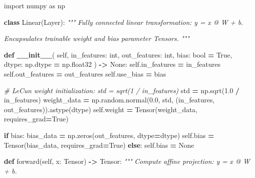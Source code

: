 \documentclass[
  letterpaper,
]{scrbook}
\newenvironment{Shaded}{\begin{snugshade}}{\end{snugshade}}
\newcommand{\BuiltInTok}[1]{#1}
\newcommand{\CommentTok}[1]{\textcolor[rgb]{0.56,0.35,0.01}{\textit{#1}}}
\newcommand{\ControlFlowTok}[1]{\textcolor[rgb]{0.13,0.29,0.53}{\textbf{#1}}}
\newcommand{\FloatTok}[1]{\textcolor[rgb]{0.00,0.00,0.81}{#1}}
\newcommand{\FunctionTok}[1]{\textcolor[rgb]{0.13,0.29,0.53}{\textbf{#1}}}
\newcommand{\ImportTok}[1]{#1}
\newcommand{\KeywordTok}[1]{\textcolor[rgb]{0.13,0.29,0.53}{\textbf{#1}}}
\newcommand{\NormalTok}[1]{#1}
\newcommand{\OperatorTok}[1]{\textcolor[rgb]{0.81,0.36,0.00}{\textbf{#1}}}
\newcommand{\VariableTok}[1]{\textcolor[rgb]{0.00,0.00,0.00}{#1}}
\begin{document}
\begin{Shaded}
\begin{Highlighting}[]
\ImportTok{import}\NormalTok{ numpy }\ImportTok{as}\NormalTok{ np}

\KeywordTok{class}\NormalTok{ Linear(Layer):}
    \CommentTok{"""}
\CommentTok{    Fully connected linear transformation: y = x @ W + b.}

\CommentTok{    Encapsulates trainable weight and bias parameter Tensors.}
\CommentTok{    """}

    \KeywordTok{def} \FunctionTok{\_\_init\_\_}\NormalTok{(}
        \VariableTok{self}\NormalTok{,}
\NormalTok{        in\_features: }\BuiltInTok{int}\NormalTok{,}
\NormalTok{        out\_features: }\BuiltInTok{int}\NormalTok{,}
\NormalTok{        bias: }\BuiltInTok{bool} \OperatorTok{=} \VariableTok{True}\NormalTok{,}
\NormalTok{        dtype: np.dtype }\OperatorTok{=}\NormalTok{ np.float32}
\NormalTok{    ) }\OperatorTok{{-}\textgreater{}} \VariableTok{None}\NormalTok{:}
        \VariableTok{self}\NormalTok{.in\_features }\OperatorTok{=}\NormalTok{ in\_features}
        \VariableTok{self}\NormalTok{.out\_features }\OperatorTok{=}\NormalTok{ out\_features}
        \VariableTok{self}\NormalTok{.use\_bias }\OperatorTok{=}\NormalTok{ bias}

        \CommentTok{\# LeCun weight initialization: std = sqrt(1 / in\_features)}
\NormalTok{        std }\OperatorTok{=}\NormalTok{ np.sqrt(}\FloatTok{1.0} \OperatorTok{/}\NormalTok{ in\_features)}
\NormalTok{        weight\_data }\OperatorTok{=}\NormalTok{ np.random.normal(}\FloatTok{0.0}\NormalTok{, std, (in\_features, out\_features)).astype(dtype)}
        \VariableTok{self}\NormalTok{.weight }\OperatorTok{=}\NormalTok{ Tensor(weight\_data, requires\_grad}\OperatorTok{=}\VariableTok{True}\NormalTok{)}

        \ControlFlowTok{if}\NormalTok{ bias:}
\NormalTok{            bias\_data }\OperatorTok{=}\NormalTok{ np.zeros(out\_features, dtype}\OperatorTok{=}\NormalTok{dtype)}
            \VariableTok{self}\NormalTok{.bias }\OperatorTok{=}\NormalTok{ Tensor(bias\_data, requires\_grad}\OperatorTok{=}\VariableTok{True}\NormalTok{)}
        \ControlFlowTok{else}\NormalTok{:}
            \VariableTok{self}\NormalTok{.bias }\OperatorTok{=} \VariableTok{None}

    \KeywordTok{def}\NormalTok{ forward(}\VariableTok{self}\NormalTok{, x: Tensor) }\OperatorTok{{-}\textgreater{}}\NormalTok{ Tensor:}
        \CommentTok{"""}
\CommentTok{        Compute affine projection: y = x @ W + b.}


\end{Highlighting}
\end{Shaded}
\end{document}
